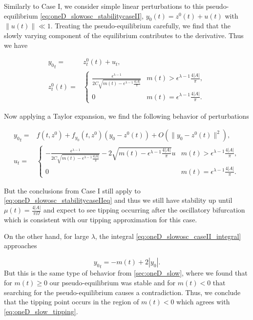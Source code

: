 Similarly to Case I, we consider simple linear perturbations to this pseudo-equilibrium \eqref{eq:oneD_slowosc_stabilitycaseII}, $y_0(t)=z^0(t)+u(t)$ with $\lVert u(t) \rVert \ll 1$. Treating the pseudo-equilibrium carefully, we find that the slowly varying component of the equilibrium contributes to the derivative. Thus we have

\begin{equation}
\begin{aligned}
{y_0}_t =& z^0_t(t) +u_t,\\
z^0_t(t) = & \begin{cases}
\frac{\epsilon^{\lambda-1}}{2C\sqrt{m(t)-\epsilon^{\lambda-1}\frac{4|A|}{\pi}}} & m(t)> \epsilon^{\lambda-1}\frac{4|A|}{\pi},\\
0 & m(t) =\epsilon^{\lambda-1}\frac{4|A|}{\pi}.
\end{cases}
\end{aligned}
\end{equation}

Now applying a Taylor expansion, we find the following behavior of perturbations

\begin{equation}\label{eq:oneD_slowosc_stabilitycaseIIeq}
\begin{aligned}
{y_0}_t =& f(t,z^0)+f_{y_0}(t,z^0)(y_0-z^0(t))+O(\lVert y_0-z^0(t) \rVert^2),\\
u_t =&\begin{cases}
-\frac{\epsilon^{\lambda-1}}{2C\sqrt{m(t)-\epsilon^{\lambda-1}\frac{4|A|}{\pi}}}-2\sqrt{m(t)-\epsilon^{\lambda-1}\frac{4|A|}{\pi}} u & m(t)>\epsilon^{\lambda-1}\frac{4|A|}{\pi},\\
0 & m(t)=\epsilon^{\lambda-1}\frac{4|A|}{\pi}.
\end{cases}
\end{aligned}
\end{equation}

But the conclusions from Case I still apply to \eqref{eq:oneD_slowosc_stabilitycaseIIeq} and thus we still have stability up until $\mu(t)=\frac{4|A|}{\pi\Omega}$ and expect to see tipping occurring after the oscillatory bifurcation which is consistent with our tipping approximation for this case.

On the other hand, for large $\lambda$, the integral \eqref{eq:oneD_slowosc_caseII_integral} approaches

\begin{equation}\label{eq:oneD_slowosc_stabilitycaseII}
{y_0}_t=-m(t)+2|y_0|.
\end{equation}
But this is the same type of behavior from \autoref{sec:oneD_slow}, where we found that for $m(t)\ge 0$ our pseudo-equilibrium was stable and for $m(t)<0$ that searching for the pseudo-equilibrium causes a contradiction. Thus, we conclude that the tipping point occurs in the region of $m(t)<0$ which agrees with \eqref{eq:oneD_slow_tipping}.
